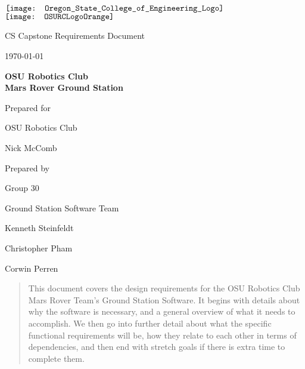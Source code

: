 \documentclass[onecolumn, draftclsnofoot, 10pt, compsoc]{IEEEtran}
\def \CapstoneTeamName{			Ground Station Software Team}
\def \CapstoneTeamNumber{		30}
\def \GroupMemberOne{			Kenneth Steinfeldt}
\def \GroupMemberTwo{			Christopher Pham}
\def \GroupMemberThree{			Corwin Perren}
\def \CapstoneProjectName{		OSU Robotics Club\\Mars Rover Ground Station}
\def \CapstoneSponsorCompany{	OSU Robotics Club}
\def \CapstoneSponsorPerson{	Nick McComb}
\def \DocType{	%
				Requirements Document
			 }
\newcommand{\NameSigPair}[1]{
  \par
  \makebox[2.75in][r]{#1} 
  \hfill
  \makebox[3.25in]{
      \makebox[2.25in]{\hrulefill} 
      \hfill
      \makebox[.75in]{\hrulefill}
  }
  \par\vspace{-12pt} 
  \textit{
      \tiny\noindent
      \makebox[2.75in]{} 
      \hfill
      \makebox[3.25in]{
          \makebox[2.25in][r]{Signature} 
          \hfill
          \makebox[.75in][r]{Date}
      }
  }
}
\renewcommand{\NameSigPair}[1]{#1}
\begin{document}
\begin{titlepage}
	\begin{singlespace}
        \begin{minipage}{7in}
			\centering
			\hspace*{-.7in}
			$\vcenter{\hbox{\texttt{[image: Oregon\_State\_College\_of\_Engineering\_Logo]}}}$
			\hspace*{.2in}
			$\vcenter{\hbox{\texttt{[image: OSURCLogoOrange]}}}$
		\end{minipage}

		\par\vspace{.35in}
		\centering
		\scshape{
			\huge CS Capstone \DocType \par
			{\large\today}\par
			\vspace{.5in}
			\textbf{\Huge\CapstoneProjectName}\par
			\vfill
			{\large Prepared for}\par
			\Huge \CapstoneSponsorCompany\par
			\vspace{5pt}
			{\Large\NameSigPair{\CapstoneSponsorPerson}\par}
			{\large Prepared by }\par
			Group\CapstoneTeamNumber\par
			\CapstoneTeamName\par 
			\vspace{5pt}
			{\Large
				\NameSigPair{\GroupMemberOne}\par
				\NameSigPair{\GroupMemberTwo}\par
				\NameSigPair{\GroupMemberThree}\par
			}
			\vspace{20pt}
            \begin{abstract}
            This document covers the design requirements for the OSU Robotics Club Mars Rover Team's Ground Station Software.
            It begins with details about why the software is necessary, and a general overview of what it needs to accomplish.
            We then go into further detail about what the specific functional requirements will be, how they relate to each other in terms of dependencies, and then end with stretch goals if there is extra time to complete them.

		\end{abstract}
		}
	\end{singlespace}
\end{titlepage}
\newpage
{}
\tableofcontents
\clearpage
\end{document}
